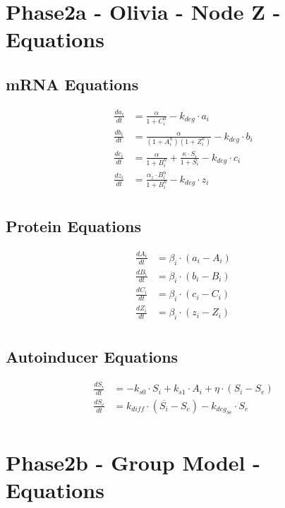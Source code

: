 \documentclass[fleqn]{article}
\begin{document}
\pagebreak

\section*{Phase2a - Olivia - Node Z - Equations}

\subsection*{mRNA Equations}
\begin{align*}
\frac{da_i}{dt} &= \frac{\alpha}{1 + C_i^n} - k_{deg} \cdot a_i \\
\frac{db_i}{dt} &= \frac{\alpha}{(1 + A_i^n)(1 + Z_i^n)} - k_{deg} \cdot b_i \\
\frac{dc_i}{dt} &= \frac{\alpha}{1 + B_i^n} + \frac{\kappa \cdot S_i}{1 + S_i} - k_{deg} \cdot c_i \\
\frac{dz_i}{dt} &= \frac{\alpha_z \cdot B_i^n}{1 + B_i^n} - k_{deg} \cdot z_i \\
\end{align*}

\subsection*{Protein Equations}
\begin{align*}
\frac{dA_i}{dt} &= \beta_i \cdot (a_i - A_i) \\
\frac{dB_i}{dt} &= \beta_i \cdot (b_i - B_i) \\
\frac{dC_i}{dt} &= \beta_i \cdot (c_i - C_i) \\
\frac{dZ_i}{dt} &= \beta_i \cdot (z_i - Z_i) \\
\end{align*}

\subsection*{Autoinducer Equations}
\begin{align*}
\frac{dS_i}{dt} &= -k_{s0} \cdot S_i + k_{s1} \cdot A_i + \eta \cdot (S_i - S_e) \\
\frac{dS_e}{dt} &= k_{diff} \cdot (\overline{S_i} - S_e) - k_{deg_{Se}} \cdot S_e \\
\end{align*}

\pagebreak

\section*{Phase2b - Group Model - Equations}
\end{document}
